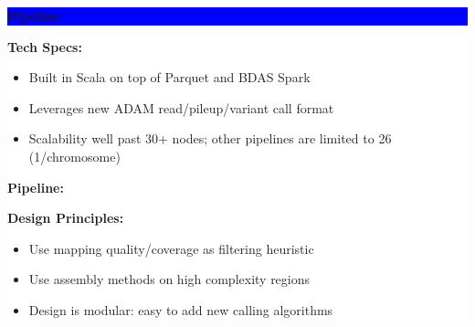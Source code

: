 \documentclass[11pt]{a0poster}
\begin{document}
{\begin{minipage}[t][2045pt][t]{\linewidth}
\begin{minipage}{0.3\linewidth}
\vspace{75pt}
\colorbox{Blue}{
\begin{minipage}{\linewidth}
\vspace{25pt}
\begin{center}
\Huge \bf \color{White} Pipeline
\end{center}
\vspace{10pt}
\end{minipage}
}
\colorbox{White}{
\begin{minipage}[t][1020pt][t]{\linewidth}
\color{Blue}
\vspace{20pt}
\LARGE
\textbf{Tech Specs:}
\begin{itemize}
\item Built in Scala on top of Parquet and BDAS Spark
\item Leverages new ADAM read/pileup/variant call format
\item Scalability well past 30+ nodes; other pipelines are limited to 26 (1/chromosome)
\end{itemize}
\textbf{Pipeline:} \\
\begin{center}
\end{center} 
\textbf{Design Principles:}
\begin{itemize}
\item Use mapping quality/coverage as filtering heuristic
\item Use assembly methods on high complexity regions
\item Design is modular: easy to add new calling algorithms
\end{itemize}
\pagebreak
\end{minipage}
}
\pagebreak
\end{minipage}
\begin{minipage}{0.03\linewidth}
\hfill
\pagebreak
\end{minipage}
\begin{minipage}{0.6\linewidth}


\end{minipage}
\end{minipage}}
\end{document}
